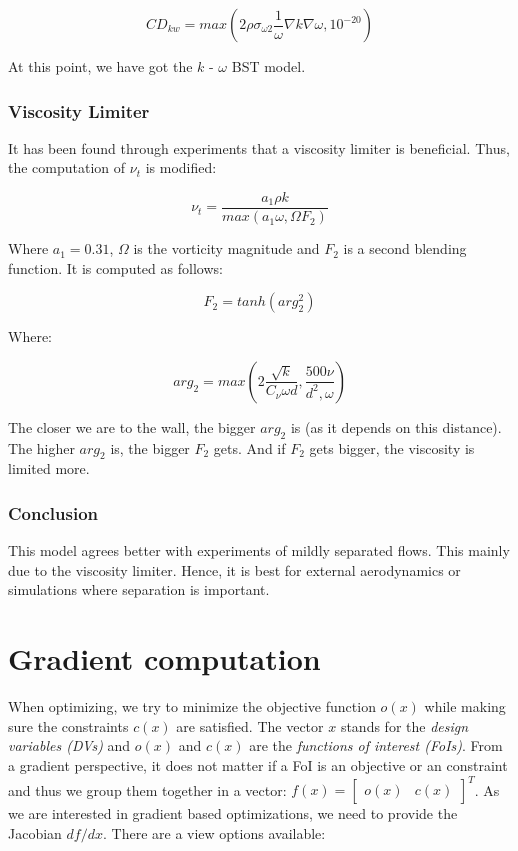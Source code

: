 \begin{equation}
    \label{eq:cdkw}
    CD_{kw} = max \left( 
    2 \rho \sigma_{\omega 2} \frac{1}{\omega} \nabla k \nabla \omega, 10^{-20} 
    \right)
\end{equation}

\noindent At this point, we have got the $k$ - $\omega$ BST model.


\subsubsection{Viscosity Limiter}
 It has been found through experiments that a viscosity limiter is beneficial.
 Thus, the computation of $\nu_t$ is modified:

\begin{equation}
    \nu_t = \frac{a_1 \rho k}{max(a_1 \omega, \Omega F_2)}
\end{equation}

\noindent Where $a_1 = 0.31$, $\Omega$ is the vorticity magnitude  and $F_2$ is
a second blending function. It is computed as follows:

\begin{equation}
    F_2 = tanh(arg_2^2)
\end{equation}

\noindent Where:

\begin{equation}
    arg_2 = max \left( 2\frac{\sqrt{k}}{C_{\nu} \omega d},
    \frac{500 \nu}{d^2, \omega}\right)
\end{equation}

\noindent The closer we are to the wall, the bigger $arg_2$ is (as it depends on
this distance). The higher $arg_2$ is, the bigger $F_2$ gets. And if $F_2$ gets
bigger, the viscosity is limited more.


\subsubsection{Conclusion}
This model agrees better with experiments of mildly separated flows. This
mainly due to the viscosity limiter. Hence, it is best for external
aerodynamics or simulations where separation is important. \cite{cfd101_sst}








\section{Gradient computation}
\label{sec:gradient_computation}
When optimizing, we try to minimize the objective function $o(x)$ while making
sure the constraints $c(x)$ are satisfied. The vector $x$ stands for the
\textit{design variables (DVs)} and $o(x)$ and $c(x)$ are the \textit{functions
of interest (FoIs)}. From a gradient perspective, it does not matter if a FoI is
an objective or an constraint and thus we group them together in a vector:
$f(x) = \begin{bmatrix} o(x) & c(x)\end{bmatrix}^T$. As we are interested in
gradient based optimizations, we need to provide the Jacobian $df / dx$. There
are a view options available: \cite{mdobook} \cite{cm1}


